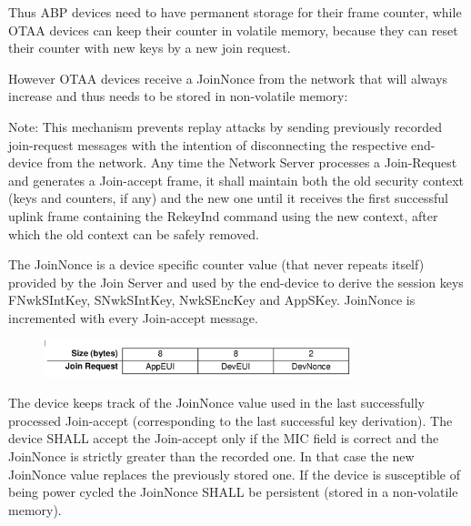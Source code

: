 {{Thus ABP devices need to have permanent storage for their frame
counter, while OTAA devices can keep their counter in volatile memory,
because they can reset their counter with new keys by a new join
request.}

{However OTAA devices receive a JoinNonce from the network that will
always increase and thus needs to be stored in non-volatile memory:}

\begin{displayquote}
Note: This mechanism prevents replay attacks by sending previously
recorded join-request messages with the intention of disconnecting the
respective end-device from the network. Any time the Network Server
processes a Join-Request and generates a Join-accept frame, it shall maintain both the old security context (keys and counters, if any) and
the new one until it receives the first successful uplink frame
containing the RekeyInd command using the new context, after which the
old context can be safely removed.
\end{displayquote}

\begin{displayquote}
The JoinNonce is a device specific counter value (that never repeats
itself) provided by the Join Server and used by the end-device to derive the session keys
FNwkSIntKey, SNwkSIntKey, NwkSEncKey and AppSKey. JoinNonce is
incremented with every Join-accept message.
\end{displayquote}

\begin{figure}[h!]
{\includegraphics[width=0.8\textwidth]{images/image16.png}}
\end{figure}

\begin{displayquote}
The device keeps track of the JoinNonce value used in the last
successfully processed Join-accept (corresponding to the last successful key derivation). The
device SHALL accept the Join-accept only if the MIC field is correct and the JoinNonce is
strictly greater than the recorded one. In that case the new JoinNonce value replaces the
previously stored one. If the device is susceptible of being power cycled the JoinNonce SHALL
be persistent (stored in a non-volatile memory).
\end{displayquote}


}
